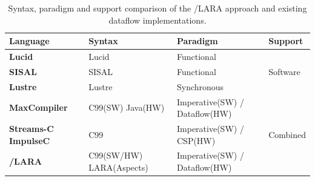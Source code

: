 \begin{table}[!ht]
  \renewcommand{\arraystretch}{1.2}
  \centering
  \begin{tabularx}{\textwidth}{X | p{2.5cm} | p{3cm} | p{1.9cm} }
    \hline
    \bf{Language}                 & \bf{Syntax}              & \bf{Paradigm}               & \bf{Support}              \\
    \hline \hline
    \bf{Lucid}                    & Lucid                    & Functional                  & \multirow{3}{*}{Software} \\
    \cline{1-3}
    \bf{SISAL}                    & SISAL                    & Functional                  &                           \\
    \cline{1-3}
    \bf{Lustre}                   & Lustre                   & Synchronous                 &                           \\
    \bf{MaxCompiler}              & C99(SW) Java(HW)         & Imperative(SW) / Dataflow(HW) & \multirow{3}{*}{Combined} \\
    \bf{Streams-C} \bf{ImpulseC}\ & C99                      & Imperative(SW) / CSP(HW)      &                           \\
    \bf{\FAST{}}/\bf{LARA}        & C99(SW/HW) LARA(Aspects) & Imperative(SW) / Dataflow(HW) &                           \\
  \end{tabularx}
  \caption{Syntax, paradigm and support comparison of the \FAST{}/LARA approach and existing dataflow implementations.}
  \label{table:feature-comparison1}
\end{table}


